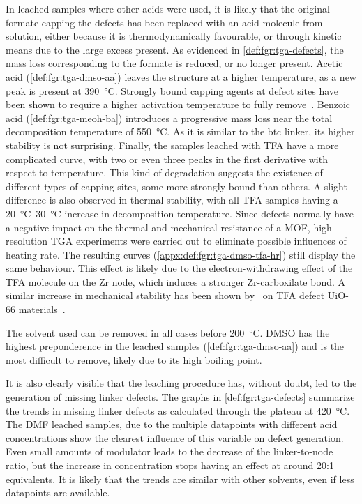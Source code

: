 In leached samples where other acids were used,
it is likely that the original formate capping the defects 
has been replaced with an acid molecule from solution,
either because it is thermodynamically favourable, or through kinetic
means due to the large excess present.
As evidenced in \autoref{def:fgr:tga-defects}, the mass 
loss corresponding to the formate is reduced, or no longer present. 
Acetic acid (\autoref{def:fgr:tga-dmso-aa}) leaves the 
structure at a higher temperature, as
a new peak is present at \SI{390}{\degreeCelsius}. Strongly
bound capping agents at defect sites have been shown to 
require a higher activation temperature to fully
remove~\cite{jiaoHeatTreatmentDefectiveUiO662017}.
Benzoic acid (\autoref{def:fgr:tga-meoh-ba}) introduces a progressive 
mass loss near the total decomposition temperature 
of \SI{550}{\degreeCelsius}.
As it is similar to the btc linker, its higher stability
is not surprising. Finally, the samples leached with 
TFA have a more complicated curve, with two or even 
three peaks in the first derivative with respect to temperature.
This kind of degradation suggests the existence of different types
of capping sites, some more strongly bound than others.
A slight difference is also observed in thermal stability,
with all TFA samples having a \SIrange{20}{30}{\degreeCelsius}
increase in decomposition temperature. Since defects normally
have a negative impact on the thermal and mechanical resistance 
of a MOF, high resolution TGA experiments were carried out
to eliminate possible influences of heating rate. The resulting
curves (\autoref{appx:def:fgr:tga-dmso-tfa-hr}) still display 
the same behaviour. This effect is likely due to the
electron-withdrawing effect of the TFA molecule on the Zr 
node, which induces a stronger Zr-carboxilate bond. A similar
increase in mechanical stability has been shown 
by~\citeauthor{vandevoordeImprovingMechanicalStability2015} on 
TFA defect UiO-66 
materials~\cite{vandevoordeImprovingMechanicalStability2015}.

The solvent used can be removed in all cases before 
\SI{200}{\degreeCelsius}. DMSO has the highest
preponderence in the leached samples (\autoref{def:fgr:tga-dmso-aa}) 
and is the most difficult to remove, likely due to its high boiling point.

It is also clearly visible that the leaching procedure has,
without doubt, led to the generation of missing linker 
defects. The graphs in \autoref{def:fgr:tga-defects} summarize the 
trends in missing linker defects as calculated through 
the plateau at \SI{420}{\degreeCelsius}. The DMF leached samples,
due to the multiple datapoints with different acid concentrations
show the clearest influence of this variable on defect
generation. Even small amounts of modulator leads to the decrease of 
the linker-to-node ratio, but the increase in concentration stops 
having an effect at around 20:1 equivalents. It is likely that
the trends are similar with other solvents, even if less 
datapoints are available.

